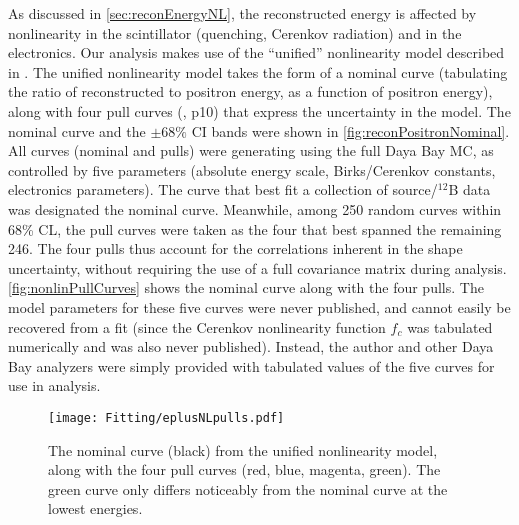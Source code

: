 \documentclass[../thesis.tex]{subfiles}
\begin{document}
As discussed in \autoref{sec:reconEnergyNL}, the reconstructed energy is affected by nonlinearity in the scintillator (quenching, Cerenkov radiation) and in the electronics. Our analysis makes use of the ``unified'' nonlinearity model described in \cite{EnergyModelUpdateYongbo}.
The unified nonlinearity model takes the form of a nominal curve (tabulating the ratio of reconstructed to positron energy, as a function of positron energy), along with four pull curves (\cite{EnergyModelUpdateSoeren}, p10) that express the uncertainty in the model. The nominal curve and the $\pm68\%$ CI bands were shown in \autoref{fig:reconPositronNominal}. All curves (nominal and pulls) were generating using the full Daya Bay MC, as controlled by five parameters (absolute energy scale, Birks/Cerenkov constants, electronics parameters). The curve that best fit a collection of source/$^{12}$B data was designated the nominal curve. Meanwhile, among 250 random curves within 68\% CL, the pull curves were taken as the four that best spanned the remaining 246. The four pulls thus account for the correlations inherent in the shape uncertainty, without requiring the use of a full covariance matrix during analysis. \autoref{fig:nonlinPullCurves} shows the nominal curve along with the four pulls. The model parameters for these five curves were never published, and cannot easily be recovered from a fit (since the Cerenkov nonlinearity function $f_c$ was tabulated numerically and was also never published). Instead, the author and other Daya Bay analyzers were simply provided with tabulated values of the five curves for use in analysis.

\begin{figure}[ht]
  \texttt{[image: Fitting/eplusNLpulls.pdf]}
  \caption{The nominal curve (black) from the unified nonlinearity model, along with the four pull curves (red, blue, magenta, green). The green curve only differs noticeably from the nominal curve at the lowest energies.}
  \label{fig:nonlinPullCurves}
\end{figure}
\end{document}
